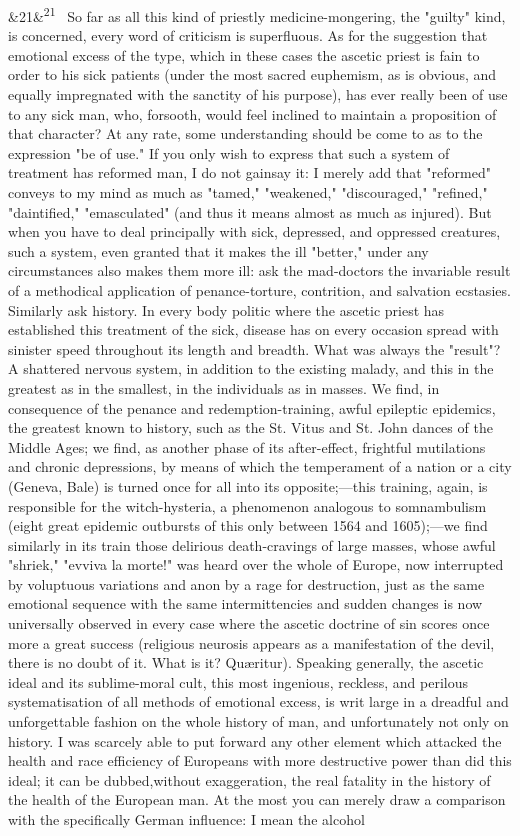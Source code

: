 \documentclass[12pt]{article}
\newcommand{\para}[1][]{\par\noindent\ifx&#1&\else\textsuperscript{\footnotesize #1}~\fi}
\begin{document}
\para[21] So far as all this kind of priestly medicine-mongering, the "guilty" kind, is concerned, every word of criticism is superfluous. As for the suggestion that emotional excess of the type, which in these cases the ascetic priest is fain to order to his sick patients (under the most sacred euphemism, as is obvious, and equally impregnated with the sanctity of his purpose), has ever really been of use to any sick man, who, forsooth, would feel inclined to maintain a proposition of that character? At any rate, some understanding should be come to as to the expression "be of use." If you only wish to express that such a system of treatment has reformed man, I do not gainsay it: I merely add that "reformed" conveys to my mind as much as "tamed," "weakened," "discouraged," "refined," "daintified," "emasculated" (and thus it means almost as much as injured). But when you have to deal principally with sick, depressed, and oppressed creatures, such a system, even granted that it makes the ill "better," under any circumstances also makes them more ill: ask the mad-doctors the invariable result of a methodical application of penance-torture, contrition, and salvation ecstasies. Similarly ask history. In every body politic where the ascetic priest has established this treatment of the sick, disease has on every occasion spread with sinister speed throughout its length and breadth. What was always the "result"? A shattered nervous system, in addition to the existing malady, and this in the greatest as in the smallest, in the individuals as in masses. We find, in consequence of the penance and redemption-training, awful epileptic epidemics, the greatest known to history, such as the St. Vitus and St. John dances of the Middle Ages; we find, as another phase of its after-effect, frightful mutilations and chronic depressions, by means of which the temperament of a nation or a city (Geneva, Bale) is turned once for all into its opposite;---this training, again, is responsible for the witch-hysteria, a phenomenon analogous to somnambulism (eight great epidemic outbursts of this only between 1564 and 1605);---we find similarly in its train those delirious death-cravings of large masses, whose awful "shriek," "evviva la morte!" was heard over the whole of Europe, now interrupted by voluptuous variations and anon by a rage for destruction, just as the same emotional sequence with the same intermittencies and sudden changes is now universally observed in every case where the ascetic doctrine of sin scores once more a great success (religious neurosis appears as a manifestation of the devil, there is no doubt of it. What is it? Quæritur). Speaking generally, the ascetic ideal and its sublime-moral cult, this most ingenious, reckless, and perilous systematisation of all methods of emotional excess, is writ large in a dreadful and unforgettable fashion on the whole history of man, and unfortunately not only on history. I was scarcely able to put forward any other element which attacked the health and race efficiency of Europeans with more destructive power than did this ideal; it can be dubbed,without exaggeration, the real fatality in the history of the health of the European man. At the most you can merely draw a comparison with the specifically German influence: I mean the alcohol 
\end{document}
